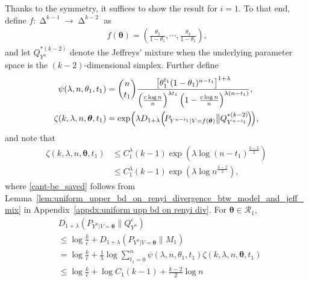 \documentclass[journal, 10pt]{IEEEtran}
\def\ds{\displaystyle}
\newcommand{\cR}{\mathcal{R}}
\theoremstyle{plain}
\theoremstyle{plain}
\theoremstyle{plain}
\theoremstyle{plain}
\newcommand{\boldtheta}{\mathbold{\theta}}
\newcommand{\simplex}{\operatorname{\Delta}}
\begin{document}
\begin{IEEEproof}
Thanks to the symmetry, it suffices to show the result for $i=1$. To that end, define $f\colon \simplex^{k-1}\to \simplex^{k-2} $ as
\begin{align}
	f(\boldtheta)=\left(\ds \frac{\theta_2}{1-\theta_1}, \cdots, \frac{\theta_k}{1-\theta_1} \right)\text{,}
\end{align}
and let $Q^{\ast(k-2)}_{Y^n}$ denote the Jeffreys' mixture when the underlying parameter space is the $(k-2)$-dimensional simplex. Further define
\begin{align}
	\psi(\lambda, n, \theta_1, t_1) &=\binom{n}{t_1} 
\frac{\left[\theta_1^{t_1} (1-\theta_1)^{n-t_1}\right]^{1+\lambda}}{{\left(\frac{c\log n}{n}\right)^{\lambda t_1}\left(1-\frac{c\log n}{n}\right)^{\lambda(n-t_1)} }}\text{,} \\
\zeta(k, \lambda, n, \boldtheta,  t_1)  &=
\exp\hspace{-0.5mm} \left(\lambda D_{1+\lambda}\Big(\hspace{-0.5mm}P_{Y^{n-t_1}|V=f(\boldtheta)} \big \| Q^{\ast(k-2)}_{Y^{n-t_1}}\hspace{-0.5mm} \Big)\hspace{-0.5mm}\right)\hspace{-0.5mm} \text{,}
\end{align}
and note that
\begin{align}
\zeta(k, \lambda, n, \boldtheta,  t_1)
&\le
C_1^\lambda(k-1)  \exp\left(\lambda \log (n-t_1)^{\frac{k-2}{2}} \right) \label{cant-be_saved} \\
&\le
C_1^\lambda(k-1) \exp\left(\lambda \log n^{\frac{k-2}{2}}\right)\text{,} \label{eqn:bunubunu}
\end{align}
where \eqref{cant-be_saved} follows from Lemma~\ref{lem:uniform_upper_bd_on_renyi_divergence_btw_model_and_jeff_mix} in Appendix~\ref{appdx:uniform upp bd on renyi div}. For $\boldtheta \in \cR_1$, 
\begin{align} 
&D_{1+\lambda }( P_{Y^n|V=\boldtheta} \| Q_{Y^n}^{\epsilon})  \nonumber \\
& \le \log \frac{k}{\epsilon} + D_{1+\lambda }\left( P_{Y^n|V=\boldtheta} \| M_1 \right) \label{eqn:general_ineq_here} \\
&=\log \frac{k}{\epsilon} + \frac{1}{\lambda}\log \sum_{t_1=0}^{n}  \psi (\lambda, n, \theta_1, t_1) \zeta(k, \lambda, n, \boldtheta,  t_1)  \\
&\le 
\log \frac{k}{\epsilon} + \log C_1(k-1) + \frac{k-2}{2} \log n \label{mertal2} \\ 

\end{align}
\end{IEEEproof}
\end{document}
